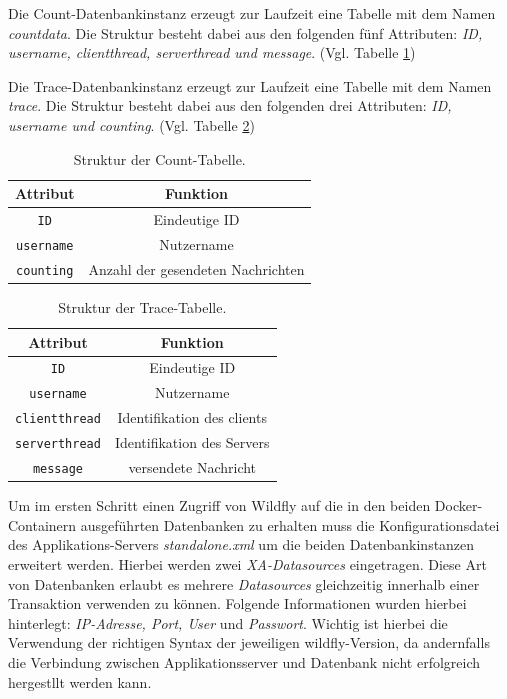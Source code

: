 \documentclass[10pt,journal,compsoc]{IEEEtran}
\begin{document}
Die Count-Datenbankinstanz erzeugt zur Laufzeit eine Tabelle mit dem Namen \textit{countdata}. Die Struktur besteht dabei aus den folgenden fünf Attributen: \textit{ID, username, clientthread, serverthread und message}. (Vgl. Tabelle \ref{tab:count})

Die Trace-Datenbankinstanz erzeugt zur Laufzeit eine Tabelle mit dem Namen \textit{trace}. Die Struktur besteht dabei aus den folgenden drei Attributen: \textit{ID, username und counting}. (Vgl. Tabelle \ref{tab:trace})

\begin{table}[h!]
	\caption{Struktur der Count-Tabelle.}
	\label{tab:count}
	\def\arraystretch{1,2} %
	\centering
	\begin{tabular}{|c||c|}\hline
		\textbf{Attribut}  & \textbf{Funktion} \\\hline \hline
		\lstinline|ID|           & Eindeutige ID             \\ \hline
		\lstinline|username|       & Nutzername             \\ \hline
		\lstinline|counting|        & Anzahl der gesendeten Nachrichten             \\\hline
	\end{tabular} 
\end{table}
\begin{table}[h!]
	\caption{Struktur der Trace-Tabelle.}
	\label{tab:trace}
	\def\arraystretch{1,2} %
	\centering
	\begin{tabular}{|c||c|}\hline
		\textbf{Attribut}  & \textbf{Funktion} \\ \hline \hline
		\lstinline|ID|           & Eindeutige ID             \\ \hline
		\lstinline|username|       & Nutzername             \\ \hline
		\lstinline|clientthread|        & Identifikation des clients             \\ \hline
		\lstinline|serverthread|        & Identifikation des Servers           \\ \hline
		\lstinline|message|        & versendete Nachricht             \\\hline 
	\end{tabular} 
\end{table}


Um im ersten Schritt einen Zugriff von Wildfly auf die in den beiden Docker-Containern ausgeführten Datenbanken zu erhalten muss die Konfigurationsdatei des Applikations-Servers \textit{standalone.xml} um die beiden Datenbankinstanzen erweitert werden. Hierbei werden zwei \textit{XA-Datasources} eingetragen. Diese Art von Datenbanken erlaubt es mehrere \textit{Datasources} gleichzeitig innerhalb einer Transaktion verwenden zu können. Folgende Informationen wurden hierbei hinterlegt: \textit{IP-Adresse, Port, User} und \textit{Passwort}. 
Wichtig ist hierbei die Verwendung der richtigen Syntax der jeweiligen wildfly-Version, da andernfalls die Verbindung zwischen Applikationsserver und Datenbank nicht erfolgreich hergestllt werden kann. 
\end{document}

